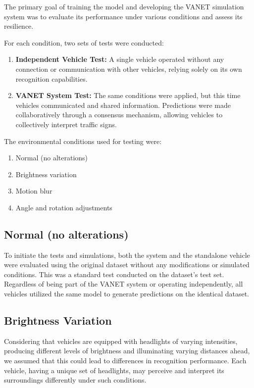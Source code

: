 The primary goal of training the model and developing the VANET simulation system was to evaluate its performance under various conditions and assess its resilience.

For each condition, two sets of tests were conducted:

\begin{enumerate}
    \item \textbf{Independent Vehicle Test:} A single vehicle operated without any connection or communication with other vehicles, relying solely on its own recognition capabilities.
    
    \item \textbf{VANET System Test:} The same conditions were applied, but this time vehicles communicated and shared information. Predictions were made collaboratively through a consensus mechanism, allowing vehicles to collectively interpret traffic signs.
\end{enumerate}

The environmental conditions used for testing were:

\begin{enumerate}
    \item Normal (no alterations)
    \item Brightness variation
    \item Motion blur
    \item Angle and rotation adjustments
\end{enumerate}

\subsection{Normal (no alterations)}

To initiate the tests and simulations, both the system and the standalone vehicle were evaluated using the original dataset
 without any modifications or simulated conditions. This was a standard test conducted on the dataset's test set. Regardless
  of being part of the VANET system or operating independently, all vehicles utilized the same model to generate predictions
   on the identical dataset.

\subsection{Brightness Variation}

Considering that vehicles are equipped with headlights of varying intensities, producing different levels 
of brightness and illuminating varying distances ahead, we assumed that this could lead to differences in 
recognition performance. Each vehicle, having a unique set of headlights, may perceive and interpret its 
surroundings differently under such conditions. 

